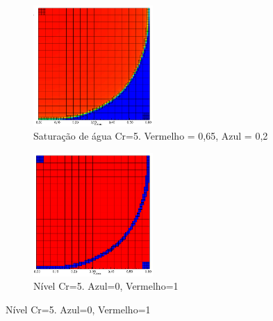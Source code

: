 \documentclass[professionalfont]{beamer}
\begin{document}
\begin{frame}{\FrameProblemName}
    \begin{figure}[!htbp]
        \centering
        \caption{Malha NU-ADM}
        \begin{subfigure}{.48\textwidth}
            \centering
            \includegraphics[height=4.6cm]{./imgs/pr4/sat_cr5.png}
            \caption{Saturação de água Cr=5. Vermelho = 0,65, Azul = 0,2}
        \end{subfigure}
        \hfill
        \begin{subfigure}{.48\textwidth}
            \centering
            \includegraphics[height=4.7cm]{./imgs/pr4/nivel_cr5.png}
            \caption{Nível Cr=5. Azul=0, Vermelho=1}
        \end{subfigure}
    
        \label{fig:fig7_pr4}
    \end{figure}
\end{frame}
\end{document}

